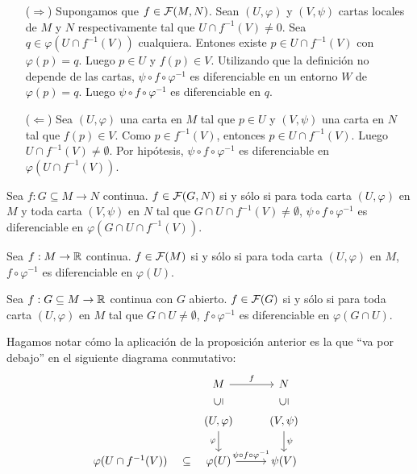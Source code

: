\documentclass[cursovd_portada.tex]{subfiles}
\begin{document}
\begin{dem}\mbox{}
\begin{itemize}
	\item[($\Rightarrow$)] Supongamos que $f \in {\cal F}(M,N)$. Sean $(U,φ)$ y $(V,ψ)$ cartas locales de $M$ y $N$ respectivamente tal que $U \cap f^{-1}(V) \neq 0$. Sea $q \in φ(U \cap f^{-1}(V))$ cualquiera. Entones existe $p \in U \cap f^{-1}(V)$ con $φ(p)=q$. Luego $p \in U$ y $f(p) \in V$. Utilizando que la definición no depende de las cartas, $ψ \circ f \circ φ^{-1}$ es diferenciable en un entorno $W$ de $φ(p)=q$. Luego $ψ \circ f \circ φ^{-1}$ es diferenciable en $q$.
	\item[($\Leftarrow$)] Sea $(U,φ)$ una carta en $M$ tal que $p \in U$ y $(V,ψ)$ una carta en $N$ tal que $f(p) \in V$. Como $p \in f^{-1}(V)$, entonces $p \in U \cap f^{-1}(V)$. Luego $U \cap f^{-1}(V) \neq \emptyset$. Por hipótesis, $ψ \circ f \circ φ^{-1}$ es diferenciable en $φ(U \cap f^{-1}(V))$. \QED
\end{itemize}
\begin{coro} Sea $f : G \subseteq M \to N$ continua. $f \in {\cal F}(G,N)$ si y sólo si para toda carta $(U,φ)$ en $M$ y toda carta $(V,ψ)$ en $N$ tal que  $G \cap U \cap f^{-1}(V) \neq \emptyset$, $ψ \circ f \circ φ^{-1}$ es diferenciable en $φ(G \cap U \cap f^{-1}(V))$.
\end{coro}
\begin{coro} Sea $f : M \to \mathbb{R}$ continua. $f \in {\cal F}(M)$ si y sólo si para toda carta $(U,φ)$ en $M$, $f \circ φ^{-1}$ es diferenciable en $φ(U)$.
\end{coro}
\begin{coro} Sea $f : G \subseteq M \to \mathbb{R}$ continua con $G$ abierto. $f \in {\cal F}(G)$ si y sólo si para toda carta $(U,φ)$ en $M$ tal que $G \cap U \neq \emptyset$, $f \circ φ^{-1}$ es diferenciable en $φ(G \cap U)$.
\end{coro}
\end{dem}
Hagamos notar c\'omo la aplicaci\'on de la proposici\'on anterior es la que ``va por debajo'' en el siguiente diagrama conmutativo:
\[
\begin{tikzcd}
& M  \arrow[r, "f"] & N & \\
& (U,\varphi)\arrow[u,phantom, "\rotatebox{90}{$\subseteq$}"]\arrow[d,"\varphi"']  & (V,\psi)\arrow[d,"\psi"]\arrow[u,phantom, "\rotatebox{90}{$\subseteq$}"] &  \\
\varphi(U\cap f^{-1}(V))\arrow[r,phantom, "{\subseteq}"] & \varphi(U) \arrow[r,"\psi\circ f\circ\varphi^{-1}"] & \psi(V)& 
\end{tikzcd}
\]
\end{document}
